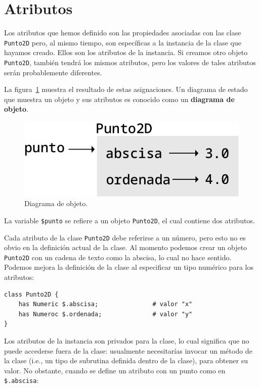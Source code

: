 \section{Atributos}
\label{attributes}

Los atributos que hemos definido son las propiedades asociadas
con las clase {\tt Punto2D} pero, al mismo tiempo, son específicas
a la instancia de la clase que hayamos creado. Ellos son los
atributos de la instancia. Si creamos otro objeto {\tt Punto2D},
también tendrá los mismos atributos, pero los valores de tales
atributos serán probablemente diferentes. 

La figura~\ref{fig.point2d} muestra el resultado de estas asignaciones.
Un diagrama de estado que muestra un objeto y sus atributos es conocido
como un {\bf diagrama de objeto}.

\begin{figure}
\centerline
{\includegraphics[scale=0.8]{figs/point2D.pdf}}
\caption{Diagrama de objeto.}
\label{fig.point2d}
\end{figure}

La variable {\tt \$punto} se refiere a un objeto {\tt Punto2D},
el cual contiene dos atributos. 

Cada atributo de la clase {\tt Punto2D} debe referirse a un 
número, pero esto no es obvio en la definición actual de la clase.
Al momento podemos crear un objeto {\tt Punto2D} con un cadena de texto
como la abscisa, lo cual no hace sentido. Podemos mejora la definición de
la clase al especificar un tipo numérico para los atributos:
%
\begin{verbatim}
class Punto2D {
	has Numeric $.abscisa;               # valor "x"
	has Numeroc $.ordenada;              # valor "y" 
}
\end{verbatim}
%
Los atributos de la instancia son privados para la clase,
lo cual significa que no puede accederse fuera de la clase:
usualmente necesitarías invocar un método de la clase (i.e., un
tipo de subrutina definida dentro de la clase), para obtener su
valor. No obstante, cuando se define un atributo con un punto como 
en \verb|$.abscisa|:

